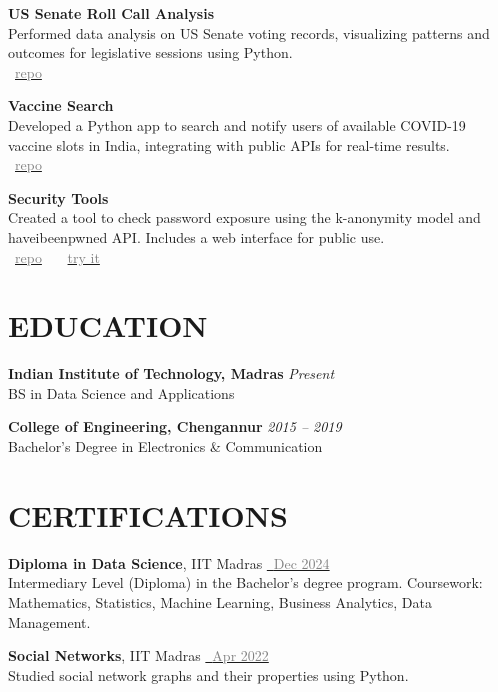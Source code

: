\documentclass[11pt,a4paper]{article}
\begin{document}
\textbf{US Senate Roll Call Analysis} \\
Performed data analysis on US Senate voting records, visualizing patterns and outcomes for legislative sessions using Python. \\
\faGithub~\href{https://github.com/jishnujp/US_senate_roll_call}{\textcolor{gray}{repo}} 

\textbf{Vaccine Search} \\
Developed a Python app to search and notify users of available COVID-19 vaccine slots in India, integrating with public APIs for real-time results. \\
\faGithub~\href{https://github.com/jishnujp/vaccine_search}{\textcolor{gray}{repo}} 

\textbf{Security Tools} \\
Created a tool to check password exposure using the k-anonymity model and haveibeenpwned API. Includes a web interface for public use. \\
\faGithub~\href{https://github.com/jishnujp/securityTools}{\textcolor{gray}{repo}} \, \textbar{} \,
\faGlobe~\href{https://jishnujp.github.io/securityTools}{\textcolor{gray}{try it}} 

\section*{EDUCATION}
\textbf{Indian Institute of Technology, Madras} \hfill \textit{Present} \\
BS in Data Science and Applications

\textbf{College of Engineering, Chengannur} \hfill \textit{2015 -- 2019} \\
Bachelor's Degree in Electronics \& Communication

\section*{CERTIFICATIONS}
\textbf{Diploma in Data Science}, IIT Madras \hfill 
\href{https://jishnujp.github.io/certificates/data_science_diploma.pdf}{\faFilePdfO~\textcolor{gray}{Dec 2024}} \\
Intermediary Level (Diploma) in the Bachelor's degree program. Coursework: Mathematics, Statistics, Machine Learning, Business Analytics, Data Management. 

\textbf{Social Networks}, IIT Madras \hfill
\href{https://archive.nptel.ac.in/content/noc/NOC22/SEM1/Ecertificates/106/noc22-cs30/Course/NPTEL22CS30S4373058402018648.jpg}{\faFilePdfO~\textcolor{gray}{Apr 2022}} \\
Studied social network graphs and their properties using Python. 
\end{document}
